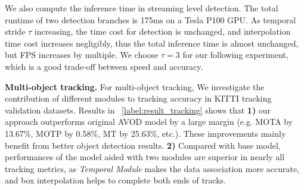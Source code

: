 \documentclass[letterpaper, 10pt, conference]{ieeeconf}  %
\begin{document}
We also compute the inference time in streaming level detection. The total runtime of two detection branches is 175ms on a Tesla P100 GPU. As temporal stride $\tau$ increasing, the time cost for detection is unchanged, and interpolation time cost increases negligibly, thus the total inference time is almost unchanged, but FPS increases by multiple. We choose $\tau = 3$ for our following experiment, which is a good trade-off between speed and accuracy.

\textbf{Multi-object tracking.} For multi-object tracking, We investigate the contribution of different modules to tracking accuracy in KITTI tracking validation datasets. Results in \tablename \, \ref{label:result_tracking} shows that \textbf{1)} our approach outperforms original AVOD model by a large margin (e.g. MOTA by 13.67\%, MOTP by 0.58\%, MT by 25.63\%, etc.). These improvements mainly benefit from better object detection results. \textbf{2)} Compared with base model, performances of the model aided with two modules are superior in nearly all tracking metrics, as \textit{Temporal Module} makes the data association more accurate, and box interpolation helps to complete both ends of tracks. 

\begin{table}
	\caption{Ablation study on KITTI Tracking validation datasets.}
	\label{label:result_tracking}
\end{table}
\end{document}
